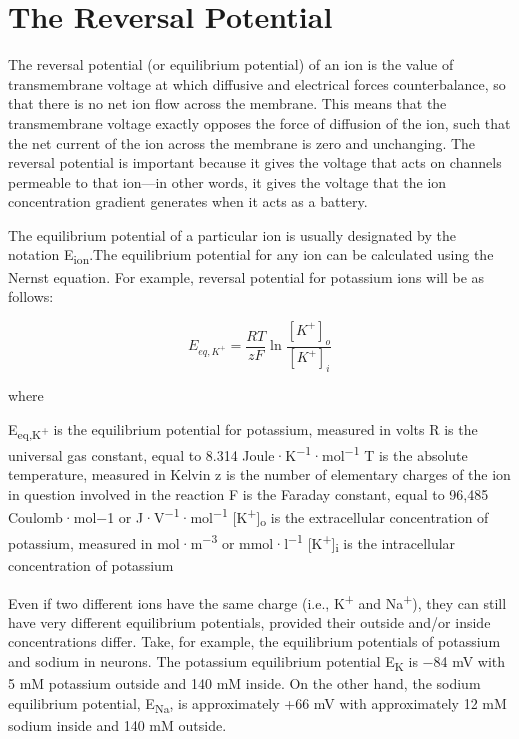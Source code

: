 \hypertarget{the-reversal-potential}{%
\section{The Reversal Potential}\label{the-reversal-potential}}

The reversal potential (or equilibrium potential) of an ion is the value of transmembrane voltage at which diffusive and electrical forces counterbalance, so that there is no net ion flow across the membrane. This means that the transmembrane voltage exactly opposes the force of diffusion of the ion, such that the net current of the ion across the membrane is zero and unchanging. The reversal potential is important because it gives the voltage that acts on channels permeable to that ion---in other words, it gives the voltage that the ion concentration gradient generates when it acts as a battery.

The equilibrium potential of a particular ion is usually designated by the notation E\textsubscript{ion}.The equilibrium potential for any ion can be calculated using the Nernst equation. For example, reversal potential for potassium ions will be as follows:

\[  E_{eq,K^+} = \frac{RT}{zF} \ln \frac{[K^+]_{o}}{[K^+]_{i}} \]

where

E\textsubscript{eq,K\textsuperscript{+}} is the equilibrium potential for potassium, measured in volts
R is the universal gas constant, equal to 8.314 Joule·K\textsuperscript{−1}·mol\textsuperscript{−1}
T is the absolute temperature, measured in Kelvin
z is the number of elementary charges of the ion in question involved in the reaction
F is the Faraday constant, equal to 96,485 Coulomb·mol−1 or J·V\textsuperscript{−1}·mol\textsuperscript{−1}
{[}K\textsuperscript{+}{]}\textsubscript{o} is the extracellular concentration of potassium, measured in mol·m\textsuperscript{−3} or mmol·l\textsuperscript{−1}
{[}K\textsuperscript{+}{]}\textsubscript{i} is the intracellular concentration of potassium

Even if two different ions have the same charge (i.e., K\textsuperscript{+} and Na\textsuperscript{+}), they can still have very different equilibrium potentials, provided their outside and/or inside concentrations differ. Take, for example, the equilibrium potentials of potassium and sodium in neurons. The potassium equilibrium potential E\textsubscript{K} is −84 mV with 5 mM potassium outside and 140 mM inside. On the other hand, the sodium equilibrium potential, E\textsubscript{Na}, is approximately +66 mV with approximately 12 mM sodium inside and 140 mM outside.

